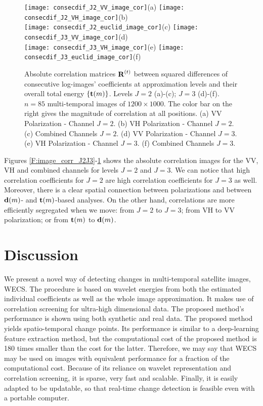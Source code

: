\documentclass[journal]{IEEEtran}
\newcommand{\vd}{{\textbf d}}
\newcommand{\vR}{{\textbf R}}
\newcommand{\vt}{{\textbf t}}
\begin{document}
\begin{figure}[htp!]
\texttt{[image: consecdif\_J2\_VV\_image\_cor]}(a)
\texttt{[image: consecdif\_J2\_VH\_image\_cor]}(b)\\
\texttt{[image: consecdif\_J2\_euclid\_image\_cor]}(c)
\texttt{[image: consecdif\_J3\_VV\_image\_cor]}(d)\\ 
\texttt{[image: consecdif\_J3\_VH\_image\_cor]}(e)
\texttt{[image: consecdif\_J3\_euclid\_image\_cor]}(f)

\caption{Absolute correlation matrices $\vR^{(t)}$ between squared differences of consecutive log-images' coefficients at approximation levels and their overall total energy $\{\vt(m)\}$. Levels $J=2$ (a)-(c);  $J=3$ (d)-(f). $n=85$ multi-temporal images of $1200\times 1000$. The color bar on the right gives the magnitude of correlation at all positions. (a) {\sc VV  Polarization - Channel} $J=2$. (b) {\sc VH  Polarization - Channel} $J=2$. (c) {\sc Combined Channels} $J=2$. (d)  {\sc VV  Polarization - Channel} $J=3$. (e) {\sc VH  Polarization - Channel} $J=3$. (f) {\sc Combined Channels} $J=3$.} 
\label{F:image_corr_J2J3_consec}
\end{figure}

Figures \ref{F:image_corr_J2J3}-\ref{F:image_corr_J2J3_consec} shows the absolute correlation images for the VV, VH and combined channels for levels $J=2$ and $J=3$. We can notice that high correlation coefficients for $J=2$ are high correlation coefficients for $J=3$ as well. Moreover, there is a clear spatial connection between polarizations and between $\vd(m)$- and $\vt(m)$-based  analyses. On the other hand, correlations are more efficiently segregated when we move: from $J=2$ to $J=3$; from VH to VV polarization; or from  $\vt(m)$ to $\vd(m)$.




\section{Discussion}\label{section_discussion}

We present a novel way of detecting changes in multi-temporal satellite images, WECS. The procedure is based on wavelet energies from both the estimated individual coefficients as well as the whole image approximation. It makes use of correlation screening for ultra-high dimensional data. The proposed method's performance is shown using both synthetic and real data. The proposed method yields spatio-temporal  change points. Its performance is similar to a deep-learning feature extraction method, but the computational cost of the proposed method is 180 times smaller than the cost for the latter. Therefore, we may say that WECS may be used on images with equivalent performance for a fraction of the computational cost. Because of its reliance on wavelet representation and correlation screening, it is sparse, very fast and scalable. Finally, it is easily adapted to be updatable, so that real-time change detection is feasible even with a portable computer.
\end{document}
